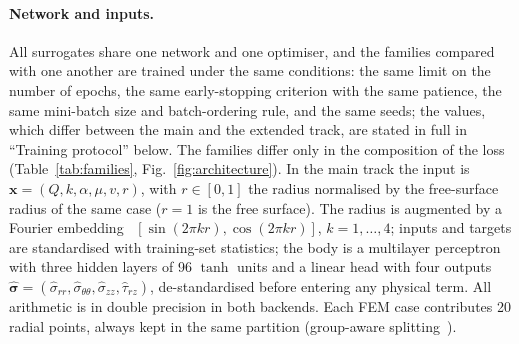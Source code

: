 \documentclass[subscriptcorrection,upint,varvw,barcolor=Goldenrod3,mathalfa=cal=euler,balance,hyphenate,french,pdf-a]{asmejour} %
\begin{document}
\paragraph{Network and inputs.}
All surrogates share one network and one optimiser, and the families compared
with one another are trained under the same conditions: the same limit on the
number of epochs, the same early-stopping criterion with the same patience, the
same mini-batch size and batch-ordering rule, and the same seeds; the values,
which differ between the main and the extended track, are stated in full in
``Training protocol'' below. The
families differ only in the composition of the loss (Table~\ref{tab:families},
Fig.~\ref{fig:architecture}). In the main track the input is
$\mathbf{x}=(Q,k,\alpha,\mu,v,r)$, with $r\in[0,1]$ the radius normalised by the
free-surface radius of the same case ($r=1$ is the free surface).
The radius is augmented by a Fourier embedding~\citep{tancik2020fourier} $[\sin(2\pi k r),\cos(2\pi k r)]$,
$k=1,\dots,4$;
inputs and targets are standardised with training-set statistics; the body is a
multilayer perceptron with three hidden layers of 96 $\tanh$ units and a linear
head with four outputs
$\hat{\boldsymbol\sigma}=(\hat\sigma_{rr},\hat\sigma_{\theta\theta},\hat\sigma_{zz},\hat\tau_{rz})$,
de-standardised before entering any physical term.
All arithmetic is in double precision in both backends.
Each FEM case contributes 20 radial points, always kept in the same partition
(group-aware splitting~\citep{roberts2017crossvalidation}).
\end{document}

